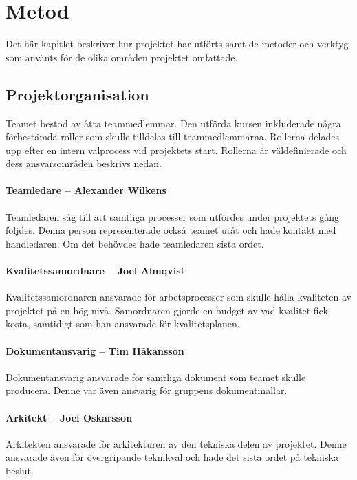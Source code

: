 \chapter{Metod}
\label{cha:method}
Det här kapitlet beskriver hur projektet har utförts samt de metoder och verktyg som använts för de olika områden projektet omfattade.

\section{Projektorganisation}
Teamet bestod av åtta teammedlemmar. Den utförda kursen inkluderade några förbestämda roller som skulle tilldelas till teammedlemmarna. Rollerna delades upp efter en intern valprocess vid projektets start. Rollerna är väldefinierade och dess ansvarsområden beskrivs nedan.

\subsubsection*{Teamledare -- Alexander Wilkens}
Teamledaren såg till att samtliga processer som utfördes under projektets gång följdes. Denna person representerade också teamet utåt och hade kontakt med handledaren. Om det behövdes hade teamledaren sista ordet.

\subsubsection*{Kvalitetssamordnare -- Joel Almqvist}
Kvalitetssamordnaren ansvarade för arbetsprocesser som skulle hålla kvaliteten av projektet på en hög nivå. Samordnaren gjorde en budget av vad kvalitet fick kosta, samtidigt som han ansvarade för kvalitetsplanen.

\subsubsection*{Dokumentansvarig -- Tim Håkansson}
Dokumentansvarig ansvarade för samtliga dokument som teamet skulle producera. Denne var även ansvarig för gruppens dokumentmallar.

\subsubsection*{Arkitekt -- Joel Oskarsson}
Arkitekten ansvarade för arkitekturen av den tekniska delen av projektet. Denne ansvarade även för övergripande teknikval och hade det sista ordet på tekniska beslut.

